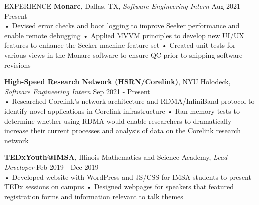 \documentclass{resume} %
\begin{document}
\begin{rSection}{EXPERIENCE}
\textbf{\bf Monarc}, Dallas, TX, {\emph{Software Engineering Intern}} \hfill Aug 2021 - Present\\
• Devised error checks and boot logging to improve Seeker performance and enable remote debugging \newline
• Applied MVVM principles to develop new UI/UX features to enhance the Seeker machine feature-set
\newline
• Created unit tests for various views in the Monarc software to ensure QC prior to shipping software revisions


\textbf{\bf High-Speed Research Network (HSRN/Corelink)}, NYU Holodeck, {\emph{Software Engineering Intern}} \hfill Sep 2021 - Present \\%
• Researched Corelink’s network architecture and RDMA/InfiniBand protocol to identify novel applications in Corelink infrastructure \newline
• Ran memory tests to determine whether using RDMA would enable researchers to dramatically increase their current processes and analysis of data on the Corelink research network

\textbf{\bf TEDxYouth@IMSA}, Illinois Mathematics and Science Academy, {\emph{Lead Developer}}  \hfill Feb 2019 - Dec 2019\\
• Developed website with WordPress and JS/CSS for IMSA students to present TEDx sessions on campus \newline
• Designed webpages for speakers that featured registration forms and information relevant to talk themes


\end{rSection} 
\end{document}
